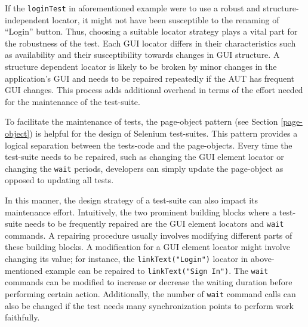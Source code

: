 If the \texttt{loginTest} in aforementioned example were to use a robust and structure-independent locator, it might not have been susceptible to the renaming of ``Login'' button. Thus, choosing a suitable locator strategy plays a vital part for the robustness of the test. Each GUI locator differs in their characteristics such as availability and their susceptibility towards changes in GUI structure. A structure dependent locator is likely to be broken by minor changes in the application's GUI and needs to be repaired repeatedly if the AUT has frequent GUI changes. This process adds additional overhead in terms of the effort needed for the maintenance of the test-suite.  

To facilitate the maintenance of tests, the page-object pattern (see Section \ref{page-object}) is helpful for the design of Selenium test-suites. This pattern provides a logical separation between the tests-code and the page-objects. Every time the test-suite needs to be repaired, such as changing the GUI element locator or changing the \texttt{wait} periods, developers can simply update the page-object as opposed to updating all tests. 

In this manner, the design strategy of a test-suite can also impact its maintenance effort. Intuitively, the two prominent building blocks where a test-suite needs to be frequently repaired are the GUI element locators and \texttt{wait} commands. A repairing procedure usually involves modifying different parts of these building blocks. A modification for a GUI element locator might involve changing its value; for instance, the \texttt{linkText("Login")} locator in above-mentioned example can be repaired to \texttt{linkText("Sign In")}. The \texttt{wait} commands can be modified to increase or decrease the waiting duration before performing certain action. Additionally, the number of \texttt{wait} command calls can also be changed if the test needs many synchronization points to perform work faithfully. 

